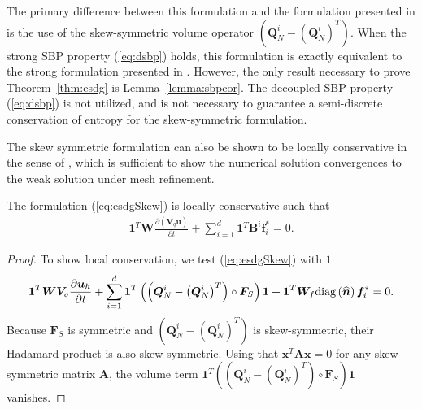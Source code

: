 \documentclass{svjour3}                     %
\renewcommand{\hat}{\widehat}
\newcommand{\diag}[1]{{\rm diag}\LRp{#1}}
\newcommand{\pd}[2]{\frac{\partial#1}{\partial#2}}
\newcommand{\LRp}[1]{\left( #1 \right)}
\begin{document}
\begin{remark}
The primary difference between this formulation and the formulation presented in \cite{chan2017discretely} is the use of the skew-symmetric volume operator $\LRp{\bm{Q}^i_N - \LRp{\bm{Q}^i_N}^T}$.  When the strong SBP property (\ref{eq:dsbp}) holds, this formulation is exactly equivalent to the strong formulation presented in \cite{chan2017discretely}.  However, the only result necessary to prove Theorem~\ref{thm:esdg} is Lemma~\ref{lemma:sbpcor}.  The decoupled SBP property (\ref{eq:dsbp}) is not utilized, and is not necessary to guarantee a semi-discrete conservation of entropy for the skew-symmetric formulation.  
\end{remark}


The skew symmetric formulation can also be shown to be locally conservative in the sense of \cite{shi2017local}, which is sufficient to show the numerical solution convergences to the weak solution under mesh refinement.  
\begin{theorem}
The formulation (\ref{eq:esdgSkew}) is locally conservative such that
\begin{align}
\bm{1}^T\bm{W}\pd{\LRp{\bm{V}_q\bm{u}}}{t} + \sum_{i=1}^d\bm{1}^T\bm{B}^i\bm{f}_i^* = 0. 
\end{align}
\end{theorem}
\begin{proof}
To show local conservation, we test (\ref{eq:esdgSkew}) with $1$
\begin{align}
\bm{1}^T\bm{W}\bm{V}_q\pd{\bm{u}_h}{t} + \sum_{i=1}^d
\bm{1}^T
\LRp{\LRp{\bm{Q}^i_N - \LRp{\bm{Q}^i_N}^T} \circ \bm{F}_S}\bm{1} + \bm{1}^T\bm{W}_f \diag{\hat{\bm{n}}}\bm{f}_i^* = 0. 
\end{align}
Because $\bm{F}_S$ is symmetric and $\LRp{\bm{Q}^i_N - \LRp{\bm{Q}^i_N}^T}$ is skew-symmetric, their Hadamard product is also skew-symmetric.  Using that $\bm{x}^T\bm{A}\bm{x} = 0$ for any skew symmetric matrix $\bm{A}$, the volume term $\bm{1}^T\LRp{\LRp{\bm{Q}^i_N - \LRp{\bm{Q}^i_N}^T} \circ \bm{F}_S}\bm{1}$ vanishes.
\end{proof}
\end{document}
